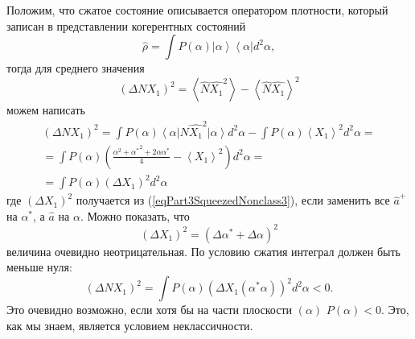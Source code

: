 Положим, что сжатое состояние описывается оператором плотности,
который записан в представлении когерентных состояний
\[
\hat{\rho} = \int P\left(\alpha\right)
\left|\alpha\right>
\left<\alpha\right| d^2 \alpha,
\]
тогда для среднего значения 
\begin{equation}
\left(\Delta N X_1\right)^2 = 
\left<\hat{N} \hat{X_1}^2\right> - \left<\hat{N} \hat{X_1}\right>^2 
\label{eqPart3SqueezedNonclass3}
\end{equation}
можем написать
\begin{eqnarray}
  \left(\Delta N X_1\right)^2 =
  \int P\left(\alpha\right)
  \left<\alpha\right|
  \hat{N} \hat{X_1}^2
  \left|\alpha\right> d^2 \alpha -
  \int P\left(\alpha\right)
  \left< X_1 \right>^2
  d^2 \alpha
  =
  \nonumber \\
  =
  \int  
  P\left(\alpha\right)
  \left(
  \frac{
    \alpha^2 + {\alpha^\ast}^2 +
    2 \alpha \alpha^\ast}{4}
  - \left< X_1 \right>^2
  \right)
   d^2 \alpha
  =
  \nonumber \\
  =
 \int 
P\left(\alpha\right)
\left(\Delta X_1\right)^2
d^2 \alpha
\end{eqnarray}
где $\left(\Delta X_1\right)^2$ получается из
(\ref{eqPart3SqueezedNonclass3}), если заменить все $\hat{a}^{+}$ на
$\alpha^{*}$, а $\hat{a}$ на $\alpha$. Можно показать, что
\[
\left(\Delta X_1\right)^2 = \left(\Delta \alpha^{*} + \Delta \alpha\right)^2
\]
величина очевидно неотрицательная. По условию сжатия интеграл должен
быть меньше нуля:
\begin{equation}
\left(\Delta N X_1\right)^2 = 
 \int 
P\left(\alpha\right)
\left(\Delta X_1\left(\alpha^{*}\alpha\right)\right)^2
d^2 \alpha < 0.
\nonumber
\end{equation}
Это очевидно возможно, если хотя бы на части плоскости
$\left(\alpha\right)$ $P\left(\alpha\right) < 0$. Это, как мы знаем,
является условием неклассичности. 

